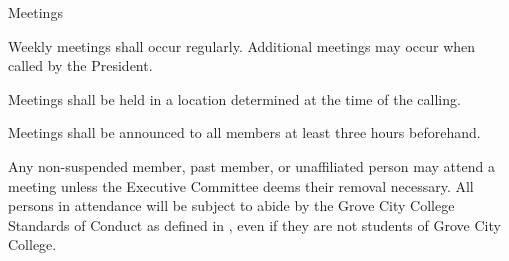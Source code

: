 {
\begin{article}{Meetings}
	\item Weekly meetings shall occur regularly. Additional meetings may occur when called by the President.
	\item Meetings shall be held in a location determined at the time of the calling.
	\item Meetings shall be announced to all members at least three hours beforehand.
	\item Any non-suspended member, past member, or unaffiliated person may attend a meeting unless the Executive Committee deems their removal necessary. All persons in attendance will be subject to abide by the Grove City College Standards of Conduct as defined in \crimson, even if they are not students of Grove City College.
\end{article}
}